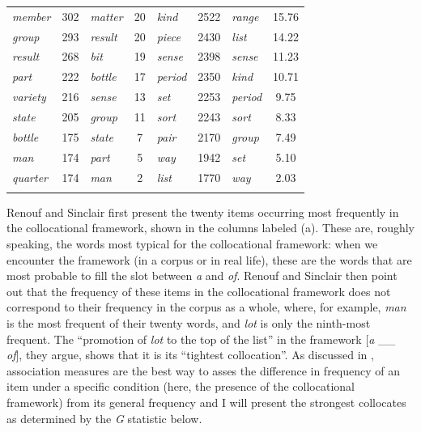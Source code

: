 \begin{table}
{\begin{tabular}[t]{lSlS|lSlS}
\textit{member} & 302 & \textit{matter} & 20 & \textit{kind} & 2522 & \textit{range} & 15.76 \\
\textit{group} & 293 & \textit{result} & 20 & \textit{piece} & 2430 & \textit{list} & 14.22 \\
\textit{result} & 268 & \textit{bit} & 19 & \textit{sense} & 2398 & \textit{sense} & 11.23 \\
\textit{part} & 222 & \textit{bottle} & 17 & \textit{period} & 2350 & \textit{kind} & 10.71 \\
\textit{variety} & 216 & \textit{sense} & 13 & \textit{set} & 2253 & \textit{period} & 9.75 \\
\textit{state} & 205 & \textit{group} & 11 & \textit{sort} & 2243 & \textit{sort} & 8.33 \\
\textit{bottle} & 175 & \textit{state} & 7 & \textit{pair} & 2170 & \textit{group} & 7.49 \\
\textit{man} & 174 & \textit{part} & 5 & \textit{way} & 1942 & \textit{set} & 5.10 \\
\textit{quarter} & 174 & \textit{man} & 2 & \textit{list} & 1770 & \textit{way} & 2.03 \\
\lspbottomrule
\end{tabular}}
\end{table}

Renouf and Sinclair first present the twenty items occurring most frequently in the collocational  framework,  shown in the columns labeled (a). These are, roughly speaking, the words most typical for the collocational framework: when we encounter the framework (in a corpus or in real life), these are the words that are most probable to fill the slot between \textit{a} and \textit{of}. Renouf and Sinclair then point out that the frequency  of these items in the collocational framework  does not correspond to their frequency in the corpus as a whole, where, for example, \textit{man} is the most frequent of their twenty words, and \textit{lot} is only the ninth\hyp{}most frequent. The ``promotion of \textit{lot} to the top of the list'' in the framework [\textit{a} \_\_ \textit{of}], they argue, shows that it is its ``tightest collocation''.  As discussed in , association  measures  are the best way to asses the difference in frequency  of an item under a specific condition (here, the presence of the collocational framework)  from its general frequency and I will present the strongest collocates as determined by the \emph{G} statistic  below.\largerpage

